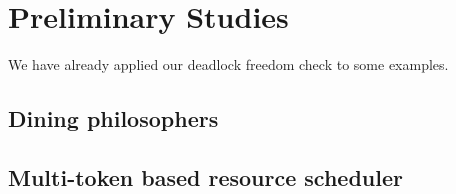 \section{Preliminary Studies}

We have already applied our deadlock freedom check to some examples.


\subsection{Dining philosophers}



\subsection{Multi-token based resource scheduler}




